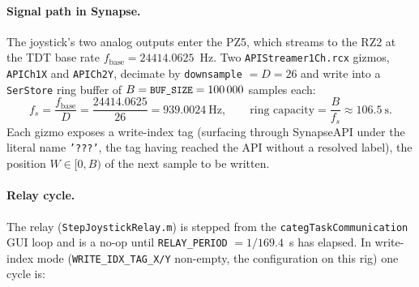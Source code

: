 \documentclass[11pt,a4paper]{article}
\newcommand{\code}[1]{\texttt{\small #1}}
\newcommand{\file}[1]{\texttt{\small #1}}
\begin{document}
\paragraph{Signal path in Synapse.} The joystick's two analog outputs enter the
PZ5, which streams to the RZ2 at the TDT base rate
$f_{\text{base}} = 24414.0625$~Hz. Two \code{APIStreamer1Ch.rcx} gizmos,
\code{APICh1X} and \code{APICh2Y}, decimate by \code{downsample} $= D = 26$ and
write into a \code{SerStore} ring buffer of $B = \code{BUF\_SIZE} = 100\,000$
samples each:
\begin{equation}
  f_s = \frac{f_{\text{base}}}{D} = \frac{24414.0625}{26} = 939.0024 \ \text{Hz},
  \qquad
  \text{ring capacity} = \frac{B}{f_s} \approx 106.5 \ \text{s}.
  \label{eq:fs}
\end{equation}
Each gizmo exposes a write-index tag (surfacing through SynapseAPI under the
literal name \code{'???'}, the tag having reached the API without a resolved
label), the position $W \in [0, B)$ of the next sample to be written.

\paragraph{Relay cycle.} The relay (\file{StepJoystickRelay.m}) is stepped from
the \file{categTaskCommunication} GUI loop and is a no-op until
\code{RELAY\_PERIOD} $= 1/169.4$~s has elapsed. In write-index mode
(\code{WRITE\_IDX\_TAG\_X/Y} non-empty, the configuration on this rig) one cycle
is:
\end{document}
